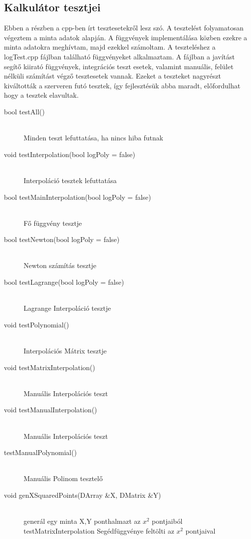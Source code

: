 \subsection{Kalkulátor tesztjei}
	Ebben a részben a cpp-ben írt tesztesetekről lesz szó. \newline
	A tesztelést folyamatosan végeztem a minta adatok alapján. A függvények implementálása közben ezekre a minta adatokra meghívtam, majd ezekkel számoltam. A teszteléshez a logTest.cpp fájlban található függvényeket alkalmaztam. \newline
	A fájlban a javítást segítő kiirató függvények, integrációs teszt esetek, valamint manuális, felület nélküli számítást végző tesztesetek vannak. \newline
	Ezeket a teszteket nagyrészt kiváltották a szerveren futó tesztek, így fejlesztésük abba maradt, előfordulhat hogy a tesztek elavultak.
	\begin{description}
		\item[bool testAll()] \hfill \\ 
			Minden teszt lefuttatása, ha nincs hiba futnak
		\item[void testInterpolation(bool logPoly = false)] \hfill \\ 
			Interpoláció tesztek lefuttatása
		\item[bool testMainInterpolation(bool logPoly = false)] \hfill \\ 
			Fő függvény tesztje
		\item[bool testNewton(bool logPoly = false)] \hfill \\ 
			Newton számítás tesztje
		\item[bool testLagrange(bool logPoly = false)] \hfill \\ 
			Lagrange Interpoláció tesztje
		\item[void testPolynomial()] \hfill \\ 
			Interpolációs Mátrix tesztje
		\item[void testMatrixInterpolation()] \hfill \\ 
			Manuális Interpolációs teszt
		\item[void testManualInterpolation()] \hfill \\ 
			Manuális Interpolációs teszt

		\item[testManualPolynomial()] \hfill \\ 
			Manuális Polinom tesztelő 
		\item[void genXSquaredPoints(DArray \&X, DMatrix \&Y)] \hfill \\ 
			generál egy minta X,Y ponthalmazt az $x^{2}$ 
			pontjaiból
		testMatrixInterpolation Segédfüggvénye
		feltölti az $x^{2}$ pontjaival 
	\end{description}
